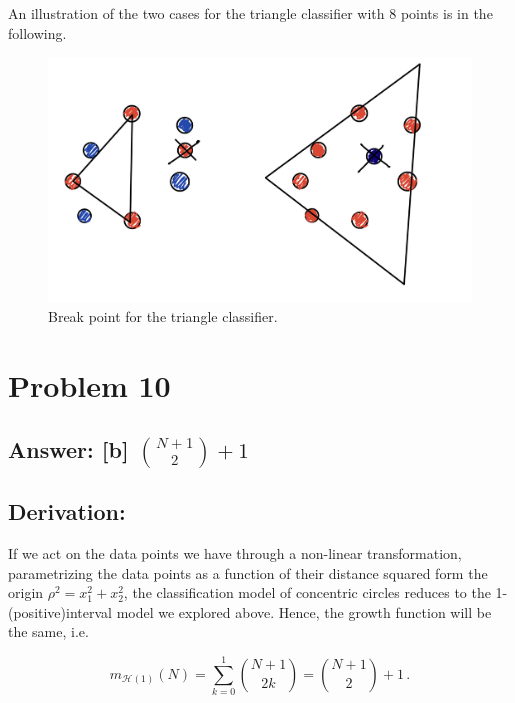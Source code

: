 \documentclass[11pt]{article}
\begin{document}
An illustration of the two cases for the triangle classifier with \(8\)
points is in the following.

\begin{figure}
    \centering
    \includegraphics[scale=0.8]{Pset 3/IMG_0165.jpg}
    \caption{Break point for the triangle classifier.}
    \label{fig:my_label}
\end{figure}

\pagebreak

    \hypertarget{problem-10}{%
\section{Problem 10}\label{problem-10}}

\hypertarget{answer-b-n1choose21}{%
\subsection{\texorpdfstring{Answer: {[}b{]}
\({N+1\choose2}+1\)}{Answer: {[}b{]} \{N+1\textbackslash{}choose2\}+1}}\label{answer-b-n1choose21}}

\hypertarget{derivation}{%
\subsection{Derivation:}\label{derivation}}

If we act on the data points we have through a non-linear
transformation, parametrizing the data points as a function of their
distance squared form the origin \(\rho^2=x_1^2+x_2^2\), the
classification model of concentric circles reduces to the
1-(positive)interval model we explored above. Hence, the growth function
will be the same, i.e.

\[
m_{\mathcal{H}(1)}(N)=\sum^1_{k=0} {N+1\choose2 k}={N+1\choose2}+1\,.
\]


    
    
    
\end{document}
